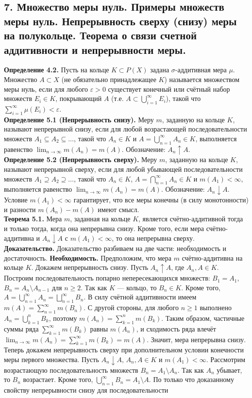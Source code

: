 \documentclass[12pt]{article}
\begin{document}
\subsection*{7. Множество меры нуль. Примеры множеств меры нуль. Непрерывность сверху (снизу)
меры на полукольце. Теорема о связи счетной аддитивности и непрерывности меры.}
\textbf{Определение 4.2.} Пусть на кольце $K \subset P(X)$ задана $\sigma$-аддитивная мера $\mu$. Множество $A \subset X$ (не обязательно принадлежащее $K$) называется множеством меры нуль, если для любого $\varepsilon > 0$ существует конечный или счётный набор множеств $E_i \in K$, покрывающий $A$ (т.е. $A \subset \bigcup_{i=1}^\infty E_i$), такой что $\sum_{i=1}^\infty \mu(E_i) < \varepsilon$. \\ \textbf{Определение 5.1 (Непрерывность снизу).} Меру $m$, заданную на кольце $K$, называют непрерывной снизу, если для любой возрастающей последовательности множеств $A_1 \subseteq A_2 \subseteq \dots$, такой что $A_n \in K$ и $A = \bigcup_{n=1}^\infty A_n \in K$, выполняется равенство $\lim_{n \to \infty} m(A_n) = m(A)$. Обозначение: $A_n \uparrow A$. \\ \textbf{Определение 5.2 (Непрерывность сверху).} Меру $m$, заданную на кольце $K$, называют непрерывной сверху, если для любой убывающей последовательности множеств $A_1 \supseteq A_2 \supseteq \dots$, такой что $A_n \in K$, $A = \bigcap_{n=1}^\infty A_n \in K$ и $m(A_1) < \infty$, выполняется равенство $\lim_{n \to \infty} m(A_n) = m(A)$. Обозначение: $A_n \downarrow A$. Условие $m(A_1) < \infty$ гарантирует, что все меры конечны (в силу монотонности) и разности $m(A_n) - m(A)$ имеют смысл. \\ \textbf{Теорема 5.1.} Мера $m$, заданная на кольце $K$, является счётно-аддитивной тогда и только тогда, когда она непрерывна снизу. Кроме того, если мера счётно-аддитивна и $A_n \downarrow A$ с $m(A_1) < \infty$, то она непрерывна сверху. \\ \textbf{Доказательство.} Доказательство разбиваем на две части: необходимость и достаточность. \textbf{Необходимость.} Предположим, что мера $m$ счётно-аддитивна на кольце $K$. Докажем непрерывность снизу. Пусть $A_n \uparrow A$, где $A_n, A \in K$. Построим последовательность попарно непересекающихся множеств: $B_1 = A_1$, $B_n = A_n \setminus A_{n-1}$ для $n \geq 2$. Так как $K$ — кольцо, то $B_n \in K$. Кроме того, $A = \bigcup_{n=1}^\infty A_n = \bigsqcup_{n=1}^\infty B_n$. В силу счётной аддитивности имеем $m(A) = \sum_{n=1}^\infty m(B_n)$. С другой стороны, для любого $n \geq 1$ выполнено $A_n = \bigcup_{k=1}^n B_k$, поэтому $m(A_n) = \sum_{k=1}^n m(B_k)$. Таким образом, частичные суммы ряда $\sum_{k=1}^\infty m(B_k)$ равны $m(A_n)$, и сходимость ряда влечёт $\lim_{n \to \infty} m(A_n) = \sum_{k=1}^\infty m(B_k) = m(A)$. Значит, мера непрерывна снизу. Теперь докажем непрерывность сверху при дополнительном условии конечности меры первого множества. Пусть $A_n \downarrow A$, $A_n, A \in K$ и $m(A_1) < \infty$. Рассмотрим возрастающую последовательность множеств $B_n = A_1 \setminus A_n$. Так как $A_n$ убывает, то $B_n$ возрастает. Кроме того, $\bigcup_{n=1}^\infty B_n = A_1 \setminus A$. По только что доказанному свойству непрерывности снизу для последовательности 
\end{document}
